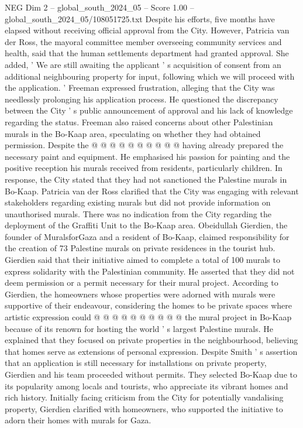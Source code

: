 \begin{textsample}{NEG Dim 2 – global\_south\_2024\_05 – Score 1.00 – global\_south\_2024\_05/108051725.txt}
Despite his efforts, five months have elapsed without receiving official approval from the City.
However, Patricia van der Ross, the mayoral committee member overseeing community services and health, said that the human settlements department had granted approval.
She added, ' We are still awaiting the applicant ' s acquisition of consent from an additional neighbouring property for input, following which we will proceed with the application. ' Freeman expressed frustration, alleging that the City was needlessly prolonging his application process.
He questioned the discrepancy between the City ' s public announcement of approval and his lack of knowledge regarding the status.
Freeman also raised concerns about other Palestinian murals in the Bo-Kaap area, speculating on whether they had obtained permission.
Despite the @ @ @ @ @ @ @ @ @ @ having already prepared the necessary paint and equipment.
He emphasised his passion for painting and the positive reception his murals received from residents, particularly children.
In response, the City stated that they had not sanctioned the Palestine murals in Bo-Kaap.
Patricia van der Ross clarified that the City was engaging with relevant stakeholders regarding existing murals but did not provide information on unauthorised murals.
There was no indication from the City regarding the deployment of the Graffiti Unit to the Bo-Kaap area.
Obeidullah Gierdien, the founder of MuralsforGaza and a resident of Bo-Kaap, claimed responsibility for the creation of 73 Palestine murals on private residences in the tourist hub.
Gierdien said that their initiative aimed to complete a total of 100 murals to express solidarity with the Palestinian community.
He asserted that they did not deem permission or a permit necessary for their mural project.
According to Gierdien, the homeowners whose properties were adorned with murals were supportive of their endeavour, considering the homes to be private spaces where artistic expression could @ @ @ @ @ @ @ @ @ @ the mural project in Bo-Kaap because of its renown for hosting the world ' s largest Palestine murals.
He explained that they focused on private properties in the neighbourhood, believing that homes serve as extensions of personal expression.
Despite Smith ' s assertion that an application is still necessary for installations on private property, Gierdien and his team proceeded without permits.
They selected Bo-Kaap due to its popularity among locals and tourists, who appreciate its vibrant homes and rich history.
Initially facing criticism from the City for potentially vandalising property, Gierdien clarified with homeowners, who supported the initiative to adorn their homes with murals for Gaza.

\end{textsample}
